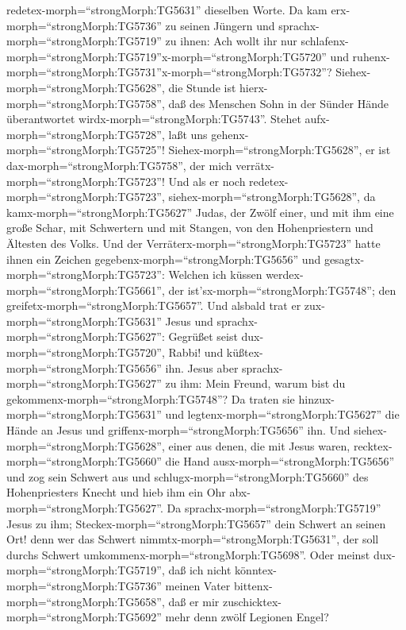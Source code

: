 redetex-morph=``strongMorph:TG5631'' dieselben Worte.  Da
kam erx-morph=``strongMorph:TG5736'' zu seinen Jüngern und
sprachx-morph=``strongMorph:TG5719'' zu ihnen: Ach wollt ihr nur
schlafenx-morph=``strongMorph:TG5719''\textbar x-morph=``strongMorph:TG5720''
und
ruhenx-morph=``strongMorph:TG5731''\textbar x-morph=``strongMorph:TG5732''?
Siehex-morph=``strongMorph:TG5628'', die Stunde ist
hierx-morph=``strongMorph:TG5758'', daß des Menschen Sohn in der Sünder
Hände überantwortet wirdx-morph=``strongMorph:TG5743''. 
Stehet aufx-morph=``strongMorph:TG5728'', laßt uns
gehenx-morph=``strongMorph:TG5725''!
Siehex-morph=``strongMorph:TG5628'', er ist
dax-morph=``strongMorph:TG5758'', der mich
verrätx-morph=``strongMorph:TG5723''!  Und als er noch
redetex-morph=``strongMorph:TG5723'',
siehex-morph=``strongMorph:TG5628'', da
kamx-morph=``strongMorph:TG5627'' Judas, der Zwölf einer, und mit ihm
eine große Schar, mit Schwertern und mit Stangen, von den Hohenpriestern
und Ältesten des Volks.  Und der
Verräterx-morph=``strongMorph:TG5723'' hatte ihnen ein Zeichen
gegebenx-morph=``strongMorph:TG5656'' und
gesagtx-morph=``strongMorph:TG5723'': Welchen ich küssen
werdex-morph=``strongMorph:TG5661'', der
ist'sx-morph=``strongMorph:TG5748''; den
greifetx-morph=``strongMorph:TG5657''.  Und alsbald trat er
zux-morph=``strongMorph:TG5631'' Jesus und
sprachx-morph=``strongMorph:TG5627'': Gegrüßet seist
dux-morph=``strongMorph:TG5720'', Rabbi! und
küßtex-morph=``strongMorph:TG5656'' ihn.  Jesus aber
sprachx-morph=``strongMorph:TG5627'' zu ihm: Mein Freund, warum bist du
gekommenx-morph=``strongMorph:TG5748''? Da traten sie
hinzux-morph=``strongMorph:TG5631'' und
legtenx-morph=``strongMorph:TG5627'' die Hände an Jesus und
griffenx-morph=``strongMorph:TG5656'' ihn.  Und
siehex-morph=``strongMorph:TG5628'', einer aus denen, die mit Jesus
waren, recktex-morph=``strongMorph:TG5660'' die Hand
ausx-morph=``strongMorph:TG5656'' und zog sein Schwert aus und
schlugx-morph=``strongMorph:TG5660'' des Hohenpriesters Knecht und hieb
ihm ein Ohr abx-morph=``strongMorph:TG5627''.  Da
sprachx-morph=``strongMorph:TG5719'' Jesus zu ihm;
Steckex-morph=``strongMorph:TG5657'' dein Schwert an seinen Ort! denn
wer das Schwert nimmtx-morph=``strongMorph:TG5631'', der soll durchs
Schwert umkommenx-morph=``strongMorph:TG5698''.  Oder
meinst dux-morph=``strongMorph:TG5719'', daß ich nicht
könntex-morph=``strongMorph:TG5736'' meinen Vater
bittenx-morph=``strongMorph:TG5658'', daß er mir
zuschicktex-morph=``strongMorph:TG5692'' mehr denn zwölf Legionen Engel?
